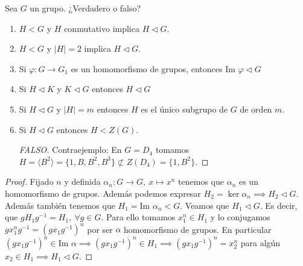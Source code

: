 \documentclass{book}
\theoremstyle{definition}
\theoremstyle{remark}
\newcommand{\normsub}{\mathbin{\triangleleft}}
\newcommand{\inv}[1]{#1^{-1}}
\newcommand{\ima}{\text{Im }}
\newcommand{\gen}[1]{\langle#1\rangle}
\begin{document}
\begin{ex}[H2.6]
	Sea $G$ un grupo. ¿Verdadero o falso?
	\begin{enumerate}
		\item $H < G$ y $H$ conmutativo implica $H \normsub G$.
		\item $H < G$ y $|H| = 2$ implica $H \normsub G$.
		\item Si $\varphi: G \to G_1$ es un homomorfismo de grupos, entonces $\ima \varphi \normsub G$
		\item Si $H \normsub K$ y $K \normsub G$ entonces $H \normsub G$
		\item Si $H \normsub G$ y $|H| = m$ entonces $H$ es el único subgrupo de $G$ de orden $m$.
		\item Si $H \normsub G$ entonces $H < Z(G)$.
		\begin{proof}[FALSO]
			Contraejemplo: En $G = D_4$ tomamos $H = \gen{B^2} = \{1, B, B^2, B^3\} \not\subset Z(D_4) = \{1, B^2\}$.
		\end{proof}
	\end{enumerate}
\end{ex}

\begin{ex}[H2.10]
	\begin{proof}
		Fijado $n$ y definida $\alpha_n : G \to G,\ x \mapsto x^n$ tenemos que $\alpha_n$ es un homomorfismo de grupos. Además podemos expresar $H_2 = \ker \alpha_n \implies H_2 \normsub G$. Además también tenemos que $H_1 = \ima \alpha_n < G$. Veamos que $H_1 \normsub G$. Es decir, que $gH_1\inv{g} = H_1,\ \forall g \in G$. Para ello tomamos $x_1^n \in H_1$ y lo conjugamos $gx_1^n\inv{g} = (gx_1\inv{g})^n$ por ser $\alpha$ homomorfismo de grupos. En particular $(gx_1\inv{g})^n \in \ima \alpha \implies (gx_1\inv{g})^n \in H_1 \implies (gx_1\inv{g})^n = x_2^n$ para algún $x_2 \in H_1 \implies H_1 \normsub G$.
	\end{proof}
\end{ex}
\end{document}
